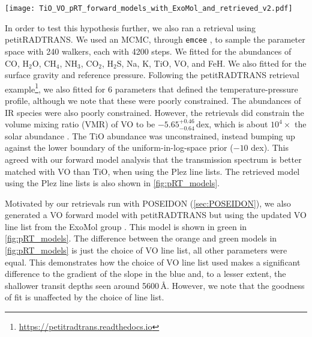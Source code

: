\documentclass[twocolumn]{aastex63}
\begin{document}
\begin{figure*}
    \centering
    \texttt{[image: TiO\_VO\_pRT\_forward\_models\_with\_ExoMol\_and\_retrieved\_v2.pdf]}
    \caption{The forward models generated using petitRADTRANS, along with the reduced $\chi^{2}$ for each with 39 degrees of freedom. We include two VO-only forward models, one using the \protect\cite{Plez1999} line list (orange) and one with the ExoMol line list \protect\citep{McKemmish2016} (green). The VO and TiO-only models have atmospheric mass fractions of 0.1\,\%. The retrieved model is shown in red and uses the \protect\cite{Plez1999} line list. This finds a VO abundance of $-5.65^{+0.46}_{-0.64}$\,dex ($\sim10^4 \times$ solar) and no evidence for TiO.}
    \label{fig:pRT_models}
\end{figure*}

In order to test this hypothesis further, we also ran a retrieval using petitRADTRANS. We used an MCMC, through \texttt{emcee} \citep{emcee}, to sample the parameter space with 240 walkers, each with 4200 steps. We fitted for the abundances of CO, H$_2$O, CH$_4$, NH$_3$, CO$_2$, H$_2$S, Na, K, TiO, VO, and FeH. We also fitted for the surface gravity and reference pressure. Following the petitRADTRANS retrieval example\footnote{\url{https://petitradtrans.readthedocs.io}}, we also fitted for 6 parameters that defined the temperature-pressure profile, although we note that these were poorly constrained. The abundances of IR species were also poorly constrained. However, the retrievals did constrain the volume mixing ratio (VMR) of VO to be $-5.65^{+0.46}_{-0.64}$\,dex, which is about $10^{4} \times$ the solar abundance \citep{Woitke2018}. The TiO abundance was unconstrained, instead bumping up against the lower boundary of the uniform-in-log-space prior ($-10$ dex). This agreed with our forward model analysis that the transmission spectrum is better matched with VO than TiO, when using the Plez line lists. The retrieved model using the Plez line lists is also shown in \autoref{fig:pRT_models}.

Motivated by our retrievals run with POSEIDON (\autoref{sec:POSEIDON}), we also generated a VO forward model with petitRADTRANS but using the updated VO line list from the ExoMol group \citep{McKemmish2016}. This model is shown in green in \autoref{fig:pRT_models}. The difference between the orange and green models in \autoref{fig:pRT_models} is just the choice of VO line list, all other parameters were equal. This demonstrates how the choice of VO line list used makes a significant difference to the gradient of the slope in the blue and, to a lesser extent, the shallower transit depths seen around 5600\,\AA. However, we note that the goodness of fit is unaffected by the choice of line list.
\end{document}
